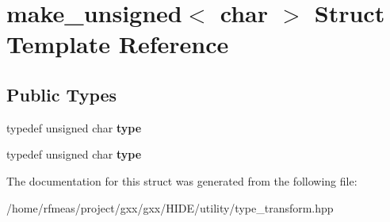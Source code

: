 \hypertarget{structmake__unsigned_3_01char_01_4}{}\section{make\+\_\+unsigned$<$ char $>$ Struct Template Reference}
\label{structmake__unsigned_3_01char_01_4}
\subsection*{Public Types}
\begin{DoxyCompactItemize}
\item 
typedef unsigned char {\bfseries type}\hypertarget{structmake__unsigned_3_01char_01_4_a39d51f0fcad3165d0fec0253949448f7}{}\label{structmake__unsigned_3_01char_01_4_a39d51f0fcad3165d0fec0253949448f7}

\item 
typedef unsigned char {\bfseries type}\hypertarget{structmake__unsigned_3_01char_01_4_a39d51f0fcad3165d0fec0253949448f7}{}\label{structmake__unsigned_3_01char_01_4_a39d51f0fcad3165d0fec0253949448f7}

\end{DoxyCompactItemize}


The documentation for this struct was generated from the following file\+:\begin{DoxyCompactItemize}
\item 
/home/rfmeas/project/gxx/gxx/\+H\+I\+D\+E/utility/type\+\_\+transform.\+hpp\end{DoxyCompactItemize}
